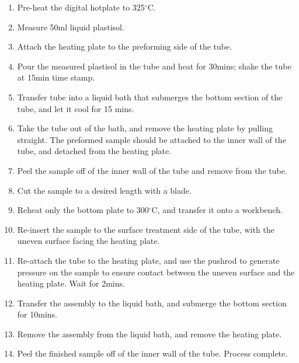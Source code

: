 \begin{enumerate}
\item Pre-heat the digital hotplate to 325$^\circ$C.
\item Measure 50ml liquid plastisol.
\item Attach the heating plate to the preforming side of the tube.
\item Pour the measured plastisol in the tube and heat for 30mins; shake the tube at 15min time stamp.
\item Transfer tube into a liquid bath that submerges the bottom section of the tube, and let it cool for 15 mins.
\item Take the tube out of the bath, and remove the heating plate by pulling straight. The preformed sample should be attached to the inner wall of the tube, and detached from the heating plate.
\item Peel the sample off of the inner wall of the tube and remove from the tube.
\item Cut the sample to a desired length with a blade. 
\item Reheat only the bottom plate to 300$^\circ$C, and transfer it onto a workbench.
\item Re-insert the sample to the surface treatment side of the tube, with the uneven surface facing the heating plate. 
\item Re-attach the tube to the heating plate, and use the pushrod to generate pressure on the sample to ensure contact between the uneven surface and the heating plate. Wait for 2mins.
\item Transfer the assembly to the liquid bath, and submerge the bottom section for 10mins.
\item Remove the assembly from the liquid bath, and remove the heating plate.
\item Peel the finished sample off of the inner wall of the tube. Process complete.
\end{enumerate}
\Blindtext[3]

